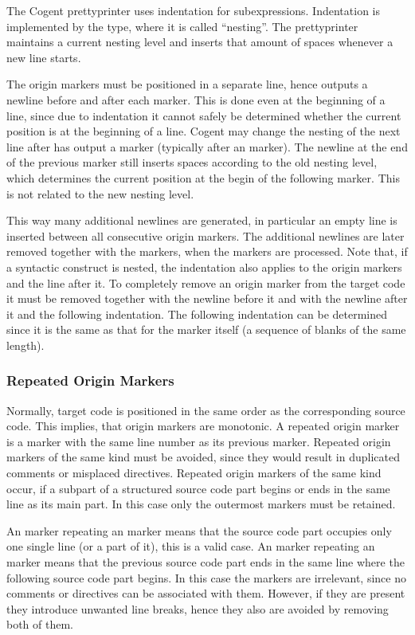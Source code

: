 The Cogent prettyprinter uses indentation for subexpressions. Indentation is implemented by the  type, 
where it is called ``nesting''. The prettyprinter maintains a
current nesting level and inserts that amount of spaces whenever a new line starts. 

The origin markers must be positioned in a separate line, hence  outputs a newline before and after
each marker. This is done even at the beginning of a line, since due to indentation it cannot safely be determined
whether the current position is at the beginning of a line. Cogent may change the nesting of the next line after 
has output a marker (typically after an  marker). The newline at the end of the previous marker 
still inserts spaces according to the old nesting level, which determines the current position at the begin of
the following marker. This is not related to the new nesting level. 

This way many additional newlines are generated, in
particular an empty line is inserted between all consecutive origin markers. The additional newlines are later removed
together with the markers, when the markers are processed. Note that, if a syntactic construct
is nested, the indentation also applies to the origin markers and the line after it. To completely remove an
origin marker from the target code it must be removed together with the newline before it and with the newline 
after it and the following indentation. The following indentation can be determined since it is the same as that 
for the marker itself (a sequence of blanks of the same length). 

\subsubsection{Repeated Origin Markers}

Normally, target code is positioned in the same order as the corresponding source code. This implies, that
origin markers are monotonic. A repeated origin marker is a marker with the same line number as its previous marker.
Repeated origin markers of the same kind must be avoided, since they would result in duplicated comments or 
misplaced directives.
Repeated origin markers of the same kind occur, if a subpart of a structured source code part begins or ends 
in the same line as its main part. In this case only the outermost markers must be retained.

An  marker repeating an  marker means that the source code
part occupies only one single line (or a part of it), this is a valid case. 
An  marker repeating an  marker means that the previous source code
part ends in the same line where the following source code part begins. In this case the markers are
irrelevant, since no comments or directives can be associated with them. However, if they are
present they introduce unwanted line breaks, hence they also are avoided by removing both of them.

